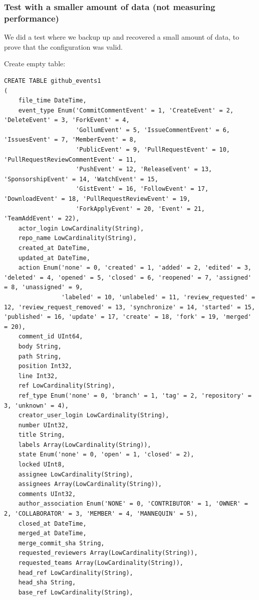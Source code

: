 \subsubsection{Test with a smaller amount of data (not measuring performance)}
\label{sec:orgbd12c9f}
We did a test where we backup up and recovered a small amount of data,
to prove that the configuration was valid.

Create empty table:
\begin{verbatim}
CREATE TABLE github_events1
(
    file_time DateTime,
    event_type Enum('CommitCommentEvent' = 1, 'CreateEvent' = 2, 'DeleteEvent' = 3, 'ForkEvent' = 4,
                    'GollumEvent' = 5, 'IssueCommentEvent' = 6, 'IssuesEvent' = 7, 'MemberEvent' = 8,
                    'PublicEvent' = 9, 'PullRequestEvent' = 10, 'PullRequestReviewCommentEvent' = 11,
                    'PushEvent' = 12, 'ReleaseEvent' = 13, 'SponsorshipEvent' = 14, 'WatchEvent' = 15,
                    'GistEvent' = 16, 'FollowEvent' = 17, 'DownloadEvent' = 18, 'PullRequestReviewEvent' = 19,
                    'ForkApplyEvent' = 20, 'Event' = 21, 'TeamAddEvent' = 22),
    actor_login LowCardinality(String),
    repo_name LowCardinality(String),
    created_at DateTime,
    updated_at DateTime,
    action Enum('none' = 0, 'created' = 1, 'added' = 2, 'edited' = 3, 'deleted' = 4, 'opened' = 5, 'closed' = 6, 'reopened' = 7, 'assigned' = 8, 'unassigned' = 9,
                'labeled' = 10, 'unlabeled' = 11, 'review_requested' = 12, 'review_request_removed' = 13, 'synchronize' = 14, 'started' = 15, 'published' = 16, 'update' = 17, 'create' = 18, 'fork' = 19, 'merged' = 20),
    comment_id UInt64,
    body String,
    path String,
    position Int32,
    line Int32,
    ref LowCardinality(String),
    ref_type Enum('none' = 0, 'branch' = 1, 'tag' = 2, 'repository' = 3, 'unknown' = 4),
    creator_user_login LowCardinality(String),
    number UInt32,
    title String,
    labels Array(LowCardinality(String)),
    state Enum('none' = 0, 'open' = 1, 'closed' = 2),
    locked UInt8,
    assignee LowCardinality(String),
    assignees Array(LowCardinality(String)),
    comments UInt32,
    author_association Enum('NONE' = 0, 'CONTRIBUTOR' = 1, 'OWNER' = 2, 'COLLABORATOR' = 3, 'MEMBER' = 4, 'MANNEQUIN' = 5),
    closed_at DateTime,
    merged_at DateTime,
    merge_commit_sha String,
    requested_reviewers Array(LowCardinality(String)),
    requested_teams Array(LowCardinality(String)),
    head_ref LowCardinality(String),
    head_sha String,
    base_ref LowCardinality(String),

\end{verbatim}
